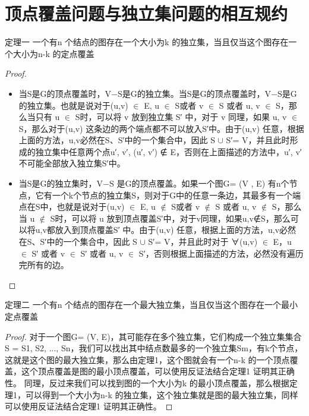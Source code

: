 \section{顶点覆盖问题与独立集问题的相互规约}

\begin{theorem}{定理一}
    一个有n 个结点的图存在一个大小为k 的独立集，当且仅当这个图存在一个大小为n-k 的定点覆盖
\end{theorem}

\begin{proof}
    \begin{itemize}
        \item 当S是G的顶点覆盖时，V−S是G的独立集。当S是G的顶点覆盖时，V−S是G的独立集。也就是说对于(u,v) $\in$ E, u $\in$ S或者 v $\in$ S 或者 u, v $\in$ S，那么当只有 u $\in$ S时，可以将 v 放到独立集 S′ 中，对于 v 同理，如果 u, v $\in$ S，那么对于(u,v) 这条边的两个端点都不可以放入S′中。由于(u,v) 任意，根据上面的方法，u,v必然在S、S′中的一个集合中，因此 S $\cup$ S′= V，并且此时形成的独立集中任意两个点u′, v′, (u′, v′) ∉ E，否则在上面描述的方法中，u′, v′不可能全部放入独立集S′中。
        \item 当S是G的独立集时，V−S 是G的顶点覆盖。如果一个图G= (V , E) 有n个节点，它有一个k个节点的独立集S，则对于G中的任意一条边，其最多有一个端点在S中，也就是说对于(u,v) $\in$ E, u $\notin$ S或者 v $\notin$ S 或者 u, v $\notin$ S，那么当 u $\notin$ S时，可以将 u 放到顶点覆盖S′中，对于v同理，如果u,v∉S，那么可以将u,v都放入到顶点覆盖S′ 中。由于(u,v) 任意，根据上面的方法，u,v必然在S、S′中的一个集合中，因此 S $\cup$ S′= V，并且此时对于 ∀(u,v) $\in$ E，u $\in$ S′ 或者 v $\in$ S′ 或者 u, v $\in$ S′，否则根据上面描述的方法，必然没有遍历完所有的边。
    \end{itemize} 
\end{proof}


\begin{theorem}{定理二}
    一个有n 个结点的图存在一个最大独立集，当且仅当这个图存在一个最小定点覆盖
\end{theorem}

\begin{proof}
    对于一个图G= (V, E)，其可能存在多个独立集，它们构成一个独立集集合S = {S1, S2, ..., Sn}，我们可以找出其中结点数最多的一个独立集Sm，有k个节点，这就是这个图的最大独立集，那么由定理1，这个图就会有一个n-k 的一个顶点覆盖，这个顶点覆盖是图的最小顶点覆盖，可以使用反证法结合定理1 证明其正确性。
    同理，反过来我们可以找到图的一个大小为k 的最小顶点覆盖，那么根据定理1，可以得到一个大小为n-k 的独立集，这个独立集就是图的最大独立集，同样可以使用反证法结合定理1 证明其正确性。
\end{proof}